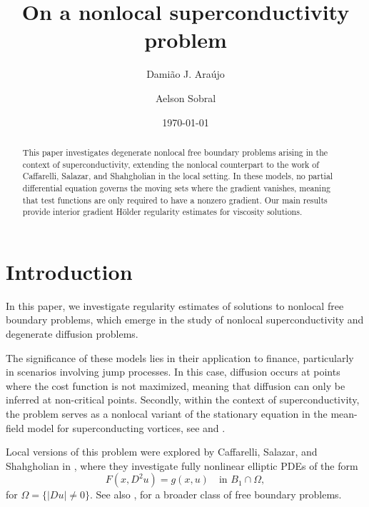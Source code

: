 \documentclass[reqno,11pt]{amsart}
\title{On a nonlocal superconductivity problem}
\author[D.J.  Araújo]{Damião J. Araújo}
\author[A. Sobral]{Aelson Sobral}
\numberwithin{equation}{section}
\numberwithin{equation}{section}
\begin{document}




  
\begin{abstract} 
This paper investigates degenerate nonlocal free boundary problems arising in the context of superconductivity, extending the nonlocal counterpart to the work of Caffarelli, Salazar, and Shahgholian \cite{CS02, CSS04} in the local setting. In these models, no partial differential equation governs the moving sets where the gradient vanishes, meaning that test functions are only required to have a nonzero gradient. Our main results provide interior gradient H\"older regularity estimates for viscosity solutions.  
\end{abstract}
  
\date{\today}

\maketitle
 
\tableofcontents 


\section{Introduction}\label{sct intro}

In this paper, we investigate regularity estimates of solutions to nonlocal free boundary problems, which emerge in the study of nonlocal superconductivity and degenerate diffusion problems. 

The significance of these models lies in their application to finance, particularly in scenarios involving jump processes. In this case, diffusion occurs at points where the cost function is not maximized, meaning that diffusion can only be inferred at non-critical points. Secondly, within the context of superconductivity, the problem serves as a nonlocal variant of the stationary equation in the mean-field model for superconducting vortices, see \cite{BR99, C95} and \cite{ESS}.

Local versions of this problem were explored by Caffarelli, Salazar, and Shahgholian in \cite{CS02, CSS04}, where they investigate fully nonlinear elliptic PDEs of the form
\begin{equation}\label{fbp2024}
F(x,D^2 u) = g(x,u) \quad \text{in } B_1 \cap \Omega,
\end{equation}
for $\Omega = \{|Du| \not = 0 \}$. See also \cite{FS}, for a broader class of free boundary problems. 
\end{document}
